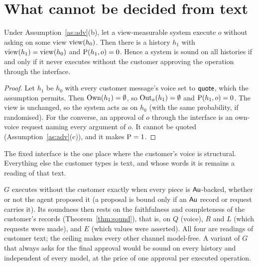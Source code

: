 \section{What cannot be decided from text}\label{sec:speech}

\begin{theorem}\label{thm:nomodel}
Under Assumption~\ref{as:adv}(b), let a view-measurable system execute $o$ without asking on some
view $\mathrm{view}(h_0)$. Then there is a history $h_1$ with $\mathrm{view}(h_1) = \mathrm{view}(h_0)$ and
$\mathrm{P}(h_1, o) = 0$. Hence a system is sound on all histories if and only if it never executes
without the customer approving the operation through the interface.
\end{theorem}
\begin{proof}
Let $h_1$ be $h_0$ with every customer message's voice set to $\mathsf{quote}$, which the assumption
permits. Then $\mathrm{Own}(h_1) = \emptyset$, so $\mathrm{Out}_a(h_1) = \emptyset$ and $\mathrm{P}(h_1, o) = 0$. The
view is unchanged, so the system acts as on $h_0$ (with the same probability, if randomised). For
the converse, an approval of $o$ through the interface is an own-voice request naming every
argument of $o$. It cannot be quoted (Assumption~\ref{as:adv}(c)), and it makes
$\mathrm{P} = 1$.
\end{proof}

The fixed interface is the one place where the customer's voice is structural. Everything else the
customer types is text, and whose words it is remains a reading of that text.

\begin{corollary}\label{cor:residual}
$G$ executes without the customer exactly when every piece is $\mathsf{Au}$-backed, whether or not the
agent proposed it (a proposal is bound only if an $\mathsf{Au}$ record or request carries it). Its soundness then
rests on the faithfulness and completeness of the customer's records (Theorem~\ref{thm:sound}),
that is, on $Q$ (voice), $R$ and $L$ (which requests were made), and $E$ (which values were
asserted). All four are readings of customer text; the ceiling makes every other channel
model-free. A variant of $G$ that always asks for the final approval would be sound on every
history and independent of every model, at the price of one approval per executed operation.
\end{corollary}

